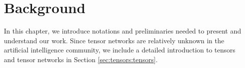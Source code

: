 \chapter{Background}
\label{ch:background}
In this chapter, we introduce notations and preliminaries needed to present and understand our work. Since tensor networks are relatively unknown in the artificial intelligence community, we include a detailed introduction to tensors and tensor networks in Section \ref{sec:tensors:tensors}.




